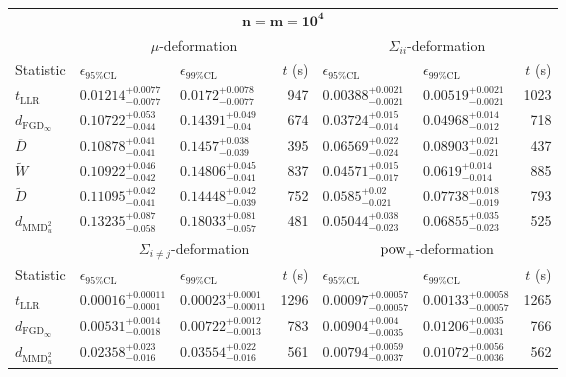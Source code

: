 \begin{tabular}{l|llr|llr}
	\toprule
	\multicolumn{7}{c}{$\mathbf{n=m=10^{4}}$} \\
	\multicolumn{1}{c}{} & \multicolumn{3}{c}{$\mu$-deformation} & \multicolumn{3}{c}{$\Sigma_{ii}$-deformation} \\
	Statistic & $\epsilon_{95\%\mathrm{CL}}$ & $\epsilon_{99\%\mathrm{CL}}$ & $t$ (s) & $\epsilon_{95\%\mathrm{CL}}$ & $\epsilon_{99\%\mathrm{CL}}$ & $t$ (s) \\
	\midrule
	$t_{\mathrm{LLR}}$ & $0.01214_{-0.0077}^{+0.0077}$ & $0.0172_{-0.0077}^{+0.0078}$ & 947 & $0.00388_{-0.0021}^{+0.0021}$ & $0.00519_{-0.0021}^{+0.0021}$ & 1023 \\
	$d_{\mathrm{FGD}_{\infty}}$ & $0.10722_{-0.044}^{+0.053}$ & $0.14391_{-0.04}^{+0.049}$ & 674 & $0.03724_{-0.014}^{+0.015}$ & $0.04968_{-0.012}^{+0.014}$ & 718 \\
	$\overline{D}$ & $0.10878_{-0.041}^{+0.041}$ & $0.1457_{-0.039}^{+0.038}$ & 395 & $0.06569_{-0.024}^{+0.022}$ & $0.08903_{-0.021}^{+0.021}$ & 437 \\
	$\widetilde{W}$ & $0.10922_{-0.042}^{+0.046}$ & $0.14806_{-0.041}^{+0.045}$ & 837 & $0.04571_{-0.017}^{+0.015}$ & $0.0619_{-0.014}^{+0.014}$ & 885 \\
	$\widetilde{D}$ & $0.11095_{-0.041}^{+0.042}$ & $0.14448_{-0.039}^{+0.042}$ & 752 & $0.0585_{-0.021}^{+0.02}$ & $0.07738_{-0.019}^{+0.018}$ & 793 \\
	$d_{\mathrm{MMD}^{2}_{u}}$ & $0.13235_{-0.058}^{+0.087}$ & $0.18033_{-0.057}^{+0.081}$ & 481 & $0.05044_{-0.023}^{+0.038}$ & $0.06855_{-0.023}^{+0.035}$ & 525 \\
	\toprule
	\multicolumn{1}{c}{} & \multicolumn{3}{c}{$\Sigma_{i\neq j}$-deformation} & \multicolumn{3}{c}{$\rm{pow}_{+}$-deformation} \\
	Statistic & $\epsilon_{95\%\mathrm{CL}}$ & $\epsilon_{99\%\mathrm{CL}}$ & $t$ (s) & $\epsilon_{95\%\mathrm{CL}}$ & $\epsilon_{99\%\mathrm{CL}}$ & $t$ (s) \\
	\midrule
	$t_{\mathrm{LLR}}$ & $0.00016_{-0.0001}^{+0.00011}$ & $0.00023_{-0.00011}^{+0.0001}$ & 1296 & $0.00097_{-0.00057}^{+0.00057}$ & $0.00133_{-0.00057}^{+0.00058}$ & 1265 \\
	$d_{\mathrm{FGD}_{\infty}}$ & $0.00531_{-0.0018}^{+0.0014}$ & $0.00722_{-0.0013}^{+0.0012}$ & 783 & $0.00904_{-0.0035}^{+0.004}$ & $0.01206_{-0.0031}^{+0.0035}$ & 766 \\
	$d_{\mathrm{MMD}^{2}_{u}}$ & $0.02358_{-0.016}^{+0.023}$ & $0.03554_{-0.016}^{+0.022}$ & 561 & $0.00794_{-0.0037}^{+0.0059}$ & $0.01072_{-0.0036}^{+0.0056}$ & 562 \\

\end{tabular}
